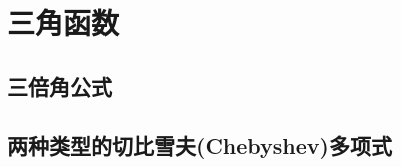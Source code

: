 
\section{三角函数}
\label{sec:triangle-function}

\subsection{三倍角公式}
\label{sec:triple-angle-formula}

\subsection{两种类型的切比雪夫(Chebyshev)多项式}
\label{sec:chebyshev-polynome}


